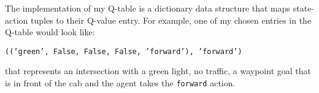 \documentclass[12pt,letterpaper]{article}
\renewenvironment{itemize}{
  \begin{list}{}{
    \setlength{\leftmargin}{1.5em}
  }
}{
  \end{list}
}
\begin{document}
The implementation of my Q-table is a dictionary data structure that maps state-action tuples to their Q-value entry. For example, one of my chosen entries in the Q-table would look like:
\begin{center}
	\texttt{(('green', False, False, False, 'forward'), 'forward')}
\end{center}
that represents an intersection with a green light, no traffic, a waypoint goal that is in front of the cab and the agent takes the \verb|forward| action.



\end{document}

